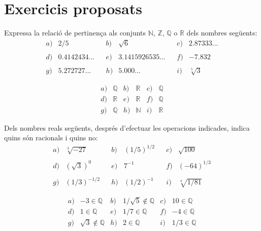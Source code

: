 \chapter{Exercicis proposats}
\label{cap:exercicis-proposats}

\begin{exercici}
Expressa la relació de pertinença als conjunts $\mathbb{N}$, $%
\mathbb{Z}$, $\mathbb{Q}$ o $\mathbb{R}$ dels nombres següents:%
\[
\begin{array}{llllllll}
a) & 2/5 &  & b) & \sqrt{6} &  & c) & 2.87333... \\ 
&  &  &  &  &  &  &  \\ 
d) & 0.4142434... &  & e) & 3.1415926535... &  & f) & -7.832 \\ 
&  &  &  &  &  &  &  \\ 
g) & 5.272727... &  & h) & 5.000... &  & i) & \sqrt[5]{3}%
\end{array}%
\]

\end{exercici}

\begin{indicacio}
%
\[
\begin{array}{cccccc}
a) & \mathbb{Q} & b) & \mathbb{R} & c) & \mathbb{Q} \\ 
d) & \mathbb{R} & e) & \mathbb{R} & f) & \mathbb{Q} \\ 
g) & \mathbb{Q} & h) & \mathbb{N} & i) & \mathbb{R}%
\end{array}%
\]
\end{indicacio}

\begin{exercici}
Dels nombres reals següents, després d’efectuar les
operacions indicades, indica quins són racionals i quins no:%
\[
\begin{array}{llllllll}
a) & \sqrt[3]{-27} &  & b) & (1/5)^{1/2} &  & c) & \sqrt{100} \\ 
&  &  &  &  &  &  &  \\ 
d) & \left( \sqrt{3}\right) ^{0} &  & e) & 7^{-1} &  & f) & (-64)^{1/3} \\ 
&  &  &  &  &  &  &  \\ 
g) & (1/3)^{-1/2} &  & h) & (1/2)^{-1} &  & i) & \sqrt[4]{1/81}%
\end{array}%
\]

\end{exercici}

\begin{indicacio}
%
\[
\begin{array}{cccccc}
a) & -3\in \mathbb{Q} & b) & 1/\sqrt{5}\notin \mathbb{Q} & c) & 10\in 
\mathbb{Q} \\ 
d) & 1\in \mathbb{Q} & e) & 1/7\in \mathbb{Q} & f) & -4\in \mathbb{Q} \\ 
g) & \sqrt{3}\notin \mathbb{Q} & h) & 2\in \mathbb{Q} & i) & 1/3\in \mathbb{Q%
}%
\end{array}%
\]
\end{indicacio}

